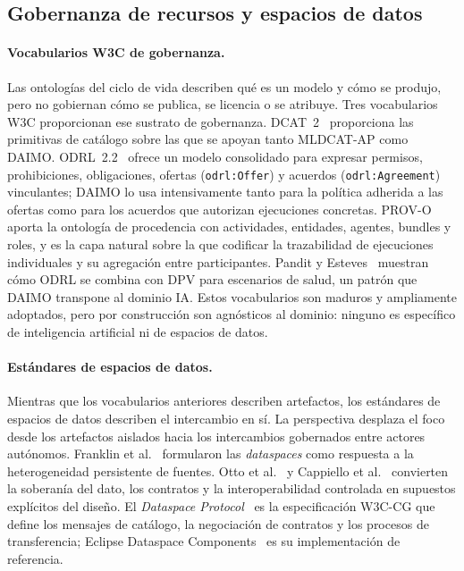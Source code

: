 \documentclass[Afour,sagev,times]{sagej}
\newcommand{\code}[1]{\texttt{#1}}
\begin{document}
\subsection{Gobernanza de recursos y espacios de datos}

\paragraph{Vocabularios W3C de gobernanza.}

Las ontologías del ciclo de vida describen qué es un modelo y cómo se produjo, pero no gobiernan cómo se publica, se licencia o se atribuye. Tres vocabularios W3C proporcionan ese sustrato de gobernanza. DCAT~2~\cite{dcat2} proporciona las primitivas de catálogo sobre las que se apoyan tanto MLDCAT-AP como DAIMO. ODRL~2.2~\cite{odrl22} ofrece un modelo consolidado para expresar permisos, prohibiciones, obligaciones, ofertas (\code{odrl:Offer}) y acuerdos (\code{odrl:Agreement}) vinculantes; DAIMO lo usa intensivamente tanto para la política adherida a las ofertas como para los acuerdos que autorizan ejecuciones concretas. PROV-O~\cite{provo} aporta la ontología de procedencia con actividades, entidades, agentes, bundles y roles, y es la capa natural sobre la que codificar la trazabilidad de ejecuciones individuales y su agregación entre participantes. Pandit y Esteves~\cite{pandit-esteves} muestran cómo ODRL se combina con DPV para escenarios de salud, un patrón que DAIMO transpone al dominio IA. Estos vocabularios son maduros y ampliamente adoptados, pero por construcción son agnósticos al dominio: ninguno es específico de inteligencia artificial ni de espacios de datos.

\paragraph{Estándares de espacios de datos.}

Mientras que los vocabularios anteriores describen artefactos, los estándares de espacios de datos describen el intercambio en sí. La perspectiva desplaza el foco desde los artefactos aislados hacia los intercambios gobernados entre actores autónomos. Franklin et al.~\cite{franklin05} formularon las \emph{dataspaces} como respuesta a la heterogeneidad persistente de fuentes. Otto et al.~\cite{otto19} y Cappiello et al.~\cite{cappiello22} convierten la soberanía del dato, los contratos y la interoperabilidad controlada en supuestos explícitos del diseño. El \emph{Dataspace Protocol}~\cite{dsp} es la especificación W3C-CG que define los mensajes de catálogo, la negociación de contratos y los procesos de transferencia; Eclipse Dataspace Components~\cite{edc} es su implementación de referencia.
\end{document}

